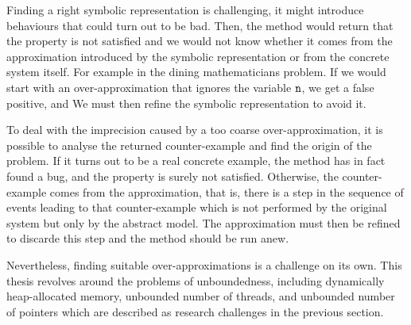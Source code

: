 

Finding a right symbolic representation 
is challenging, it might introduce
behaviours that could turn out to be bad.  Then, the method would
return that the property is not satisfied and we would not know
whether it comes from the approximation introduced by the symbolic representation or from the concrete system
itself.
For example in the dining mathematicians problem. If we would start with an over-approximation that ignores the variable $\tt n$, we get a false
  positive, and We must then refine
    the symbolic representation to
  avoid it.

To deal with the imprecision caused by a too coarse
over-approximation, it is possible to analyse the returned
counter-example and find the origin of the problem. If it turns out to
be a real concrete example, the method has in fact found a bug, and
the property is surely not satisfied. Otherwise, the counter-example
comes from the approximation, that is, there is a step in the sequence
of events leading to that counter-example which is not performed by
the original system but only by the abstract model. The approximation
must then be refined to discarde this step and the method should be run
anew.

Nevertheless, finding suitable over-approximations is a challenge on
its own. %
This thesis revolves around the problems of unboundedness, including dynamically heap-allocated memory, unbounded number of threads, and unbounded number of pointers which are described as research challenges in the previous section.
